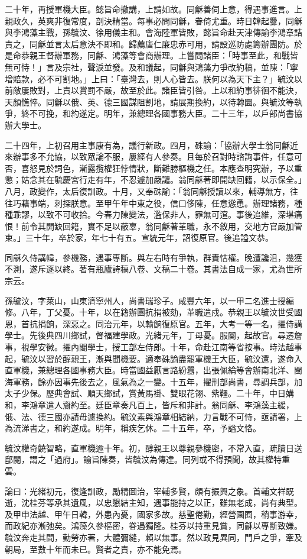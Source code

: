 \begin{pinyinscope}
二十年，再授軍機大臣。懿旨命撤講，上請如故。同龢善伺上意，得遇事進言。上親政久，英爽非復常度，剖決精當。每事必問同龢，眷倚尤重。時日韓起釁，同龢與李鴻藻主戰，孫毓汶、徐用儀主和。會海陸軍皆敗，懿旨命赴天津傳諭李鴻章詰責之，同龢並言太后意決不即和。歸薦唐仁廉忠赤可用，請設巡防處籌辦團防。於是命恭親王督辦軍務，同龢、鴻藻等會商辦理。上嘗問諸臣：「時事至此，和戰皆無可恃！」言及宗社，聲淚並發。及和議起，同龢與鴻藻力爭改約稿，並陳：「寧增賠款，必不可割地。」上曰：「臺灣去，則人心皆去。朕何以為天下主？」毓汶以前敵屢敗對，上責以賞罰不嚴，故至於此。諸臣皆引咎。上以和約事徘徊不能決，天顏憔悴。同龢以俄、英、德三國謀阻割地，請展期換約，以待轉圜。與毓汶等執爭，終不可挽，和約遂定。明年，兼總理各國事務大臣。二十三年，以戶部尚書協辦大學士。

二十四年，上初召用主事康有為，議行新政。四月，硃諭：「協辦大學士翁同龢近來辦事多不允協，以致眾論不服，屢經有人參奏。且每於召對時諮詢事件，任意可否，喜怒見於詞色，漸露攬權狂悖情狀，斷難勝樞機之任。本應查明究辦，予以重懲；姑念其在毓慶宮行走有年，不忍遽加嚴譴。翁同龢著即開缺回籍，以示保全。」八月，政變作，太后復訓政。十月，又奉硃諭：「翁同龢授讀以來，輔導無方，往往巧藉事端，刺探朕意。至甲午年中東之役，信口侈陳，任意慫恿。辦理諸務，種種乖謬，以致不可收拾。今春力陳變法，濫保非人，罪無可逭。事後追維，深堪痛恨！前令其開缺回籍，實不足以蔽辜，翁同龢著革職，永不敘用，交地方官嚴加管束。」三十年，卒於家，年七十有五。宣統元年，詔復原官。後追謚文恭。

同龢久侍講幃，參機務，遇事專斷。與左右時有爭執，群責怙權。晚遭讒沮，幾獲不測，遂斥逐以終。著有瓶廬詩稿八卷、文稿二十卷。其書法自成一家，尤為世所宗云。

孫毓汶，字萊山，山東濟寧州人，尚書瑞珍子。咸豐六年，以一甲二名進士授編修。八年，丁父憂。十年，以在籍辦團抗捐被劾，革職遣戍。恭親王以毓汶世受國恩，首抗捐餉，深惡之。同治元年，以輸餉復原官。五年，大考一等一名，擢侍講學士。先後典四川鄉試，督福建學政。光緒元年，丁母憂。服闋，起故官。尋遷詹事，視學安徽。擢內閣學士，授工部左侍郎。十年，命赴江南等省按事。時法越事起，毓汶以習於醇親王，漸與聞機要。適奉硃諭盡罷軍機王大臣，毓汶還，遂命入直軍機，兼總理各國事務大臣。時當國益厭言路紛囂，出張佩綸等會辦南北洋、閩海軍務，餘亦因事先後去之，風氣為之一變。十五年，擢刑部尚書，尋調兵部，加太子少保。歷典會試、順天鄉試，賞黃馬褂、雙眼花翎、紫韁。二十年，中日媾和，李鴻章遣人齎約至。廷臣章奏凡百上，皆斥和非計。翁同龢、李鴻藻主緩，俄、法、德三國亦請毋遽換約。毓汶素與鴻章相結納，力言戰不可恃，亟請署，上為流涕書之，和約遂成。明年，稱疾乞休。二十五年，卒，予謚文恪。

毓汶權奇饒智略，直軍機逾十年。初，醇親王以尊親參機密，不常入直，疏牘日送邸閱，謂之「過府」。諭旨陳奏，皆毓汶為傳達。同列或不得預聞，故其權特重雲。

論曰：光緒初元，復逢訓政，勵精圖治，宰輔多賢，頗有振興之象。首輔文祥既逝，沈桂芬等承其遺風，以忠懇結主知，遇事能持之以正，雖無老成，尚有典型。及甲申法越、甲午日韓，外患內憂，國家多故。慈聖倦勤，經營園囿，稍事游幸，而政紀亦漸弛矣。鴻藻久參樞密，眷遇獨隆。桂芬以持重見賞，同龢以專斷致嫌。毓汶奔走其間，勤勞亦著，大體彌縫，賴以無事。然以政見異同，門戶之爭，牽及朝局，至數十年而未已。賢者之責，亦不能免焉。


\end{pinyinscope}